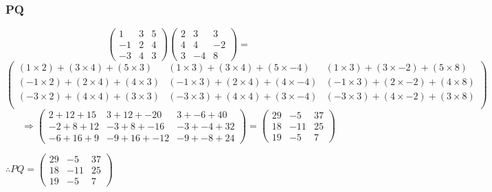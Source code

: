 \documentclass{article}
\begin{document}
\subsubsection{PQ}
\[
	\begin{pmatrix}
		1 & 3 & 5\\
		-1 & 2 & 4\\
		-3 & 4 & 3
	\end{pmatrix}
	\begin{pmatrix}
		2 & 3 & 3\\
		4 & 4 & -2\\
		3 & -4 & 8
	\end{pmatrix}
	=
\]
\[
	\begin{pmatrix}
		(1\times2)+(3\times4)+(5\times3) & (1\times3)+(3\times4)+(5\times-4) & (1\times3)+(3\times-2)+(5\times8)\\
		(-1\times2)+(2\times4)+(4\times3) & (-1\times3)+(2\times4)+(4\times-4) & (-1\times3)+(2\times-2)+(4\times8)\\
		(-3\times2)+(4\times4)+(3\times3) & (-3\times3)+(4\times4)+(3\times-4) & (-3\times3)+(4\times-2)+(3\times8)\\
	\end{pmatrix}
\]
\[
	\Rightarrow
	\begin{pmatrix}
		2+12+15 & 3+12+-20 & 3+-6+40\\
		-2+8+12 & -3+8+-16 & -3+-4+32\\
		-6+16+9 & -9+16+-12 & -9+-8+24
	\end{pmatrix}
	=
	\begin{pmatrix}
		29 & -5 & 37\\
		18 & -11 & 25\\
		19 & -5 & 7
	\end{pmatrix}
\]
\begin{center}\vspace{0.5cm}$\therefore
	PQ=
	\begin{pmatrix}
		29 & -5 & 37\\
		18 & -11 & 25\\
		19 & -5 & 7
	\end{pmatrix}
$\end{center}
\end{document}
